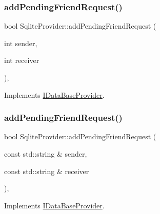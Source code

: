 \subsubsection{\texorpdfstring{add\+Pending\+Friend\+Request()}{addPendingFriendRequest()}\hspace{0.1cm}{\footnotesize\ttfamily [1/2]}}
{\footnotesize\ttfamily bool Sqlite\+Provider\+::add\+Pending\+Friend\+Request (\begin{DoxyParamCaption}\item[{int}]{sender,  }\item[{int}]{receiver }\end{DoxyParamCaption})\hspace{0.3cm}{\ttfamily [override]}, {\ttfamily [virtual]}}



Implements \mbox{\hyperlink{classIDataBaseProvider_ab8e4c2a8bb221a594947ec6216b80f95}{I\+Data\+Base\+Provider}}.

\mbox{\label{classSqliteProvider_aac8f8614546a2c5e629ad84a3536adc8}} 
\subsubsection{\texorpdfstring{add\+Pending\+Friend\+Request()}{addPendingFriendRequest()}\hspace{0.1cm}{\footnotesize\ttfamily [2/2]}}
{\footnotesize\ttfamily bool Sqlite\+Provider\+::add\+Pending\+Friend\+Request (\begin{DoxyParamCaption}\item[{const std\+::string \&}]{sender,  }\item[{const std\+::string \&}]{receiver }\end{DoxyParamCaption})\hspace{0.3cm}{\ttfamily [override]}, {\ttfamily [virtual]}}



Implements \mbox{\hyperlink{classIDataBaseProvider_ae41b4c95e8f56e613e5e37b3563ef1f0}{I\+Data\+Base\+Provider}}.

